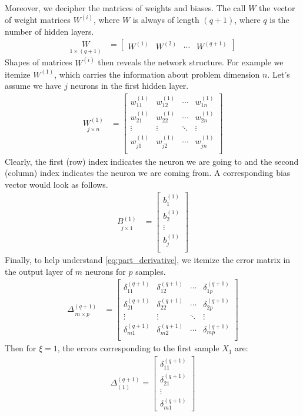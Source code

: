 Moreover, we decipher the matrices of weights and biases. The call $ W $ the vector of weight matrices $ W^{(i)} $, where $ W $ is always of length $ (q+1) $, where $ q $ is the number of hidden layers.
\begin{align*}
\underset{1\times (q+1)}{W} &= 
\begin{bmatrix}
    W^{(1)} & W^{(2)} & \cdots & W^{(q+1)}
\end{bmatrix}
\end{align*}
Shapes of matrices $ W^{(i)} $ then reveals the network structure. For example we itemize $ W^{(1)} $, which carries the information about problem dimension $ n $. Let's assume we have $ j $ neurons in the first hidden layer.
\begin{align*}
\underset{j\times n}{W^{(1)}} &=
\begin{bmatrix}
    w_{11}^{(1)} & w_{12}^{(1)} & \cdots & w_{1n}^{(1)} \\
    w_{21}^{(1)} & w_{22}^{(1)} & \cdots & w_{2n}^{(1)} \\
    \vdots & \vdots & \ddots & \vdots \\
    w_{j1}^{(1)} & w_{j2}^{(1)} & \cdots & w_{jn}^{(1)} \\      
\end{bmatrix}
\end{align*}
Clearly, the first (row) index indicates the neuron we are going to and the second (column) index indicates the neuron we are coming from. A corresponding bias vector would look as follows.
\begin{align*}
\underset{j\times 1}{B^{(1)}} &=
\begin{bmatrix}
    b_{1}^{(1)} \\
    b_{2}^{(1)} \\
    \vdots \\
    b_{j}^{(1)} \\      
\end{bmatrix}
\end{align*}
Finally, to help understand \cref{eq:part_derivative}, we itemize the error matrix in the output layer of $ m $ neurons for $ p $ samples.
\begin{align*}
\underset{m\times p}{\Delta^{(q+1)}} &=
\begin{bmatrix}
    \delta_{11}^{(q+1)} & \delta_{12}^{(q+1)} & \cdots & \delta_{1p}^{(q+1)} \\
    \delta_{21}^{(q+1)} & \delta_{22}^{(q+1)} & \cdots & \delta_{2p}^{(q+1)} \\
    \vdots & \vdots & \ddots & \vdots \\
    \delta_{m1}^{(q+1)} & \delta_{m2}^{(q+1)} & \cdots & \delta_{mp}^{(q+1)} \\      
\end{bmatrix}
\end{align*}
Then for $ \xi = 1 $, the errors corresponding to the first sample $ X_1 $ are:
\begin{align*}
\Delta_{(1)}^{(q+1)} = \begin{bmatrix} \delta_{11}^{(q+1)} \\ \delta_{21}^{(q+1)} \\ \vdots \\ \delta_{m1}^{(q+1)} \end{bmatrix}
\end{align*}